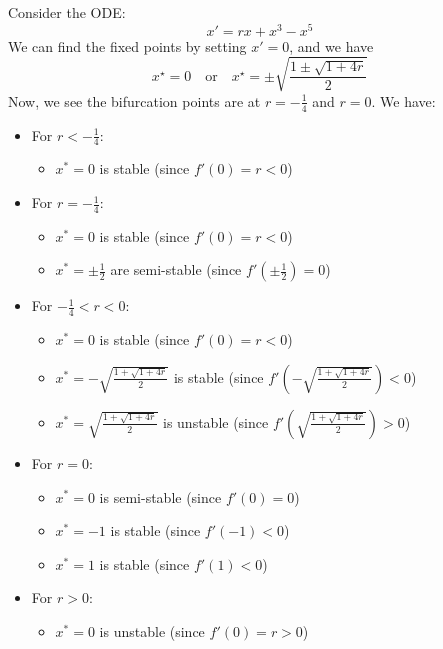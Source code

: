 \documentclass[11pt]{article}
\begin{document}
\begin{example}
    Consider the ODE:
    $$
    x' = rx + x^3 - x^5
    $$
    We can find the fixed points by setting \( x' = 0 \), and we have
    $$
    x^\star = 0 \quad \text{or} \quad x^\star = \pm\sqrt{\frac{1 \pm \sqrt{1 + 4r}}{2}}
    $$
    Now, we see the bifurcation points are at \( r = -\frac{1}{4} \) and \( r = 0 \). We have:
    \begin{itemize}
        \item For \( r < -\frac{1}{4} \):
        \begin{itemize}
            \item \( x^* = 0 \) is stable (since \( f'(0) = r < 0 \))
        \end{itemize}
        \item For \( r = -\frac{1}{4} \):
        \begin{itemize}
            \item \( x^* = 0 \) is stable (since \( f'(0) = r < 0 \))
            \item \( x^* = \pm\frac{1}{2} \) are semi-stable (since \( f'(\pm\frac{1}{2}) = 0 \))
        \end{itemize}
        \item For \( -\frac{1}{4} < r < 0 \):
        \begin{itemize}
            \item \( x^* = 0 \) is stable (since \( f'(0) = r < 0 \))
            \item \( x^* = -\sqrt{\frac{1 + \sqrt{1 + 4r}}{2}} \) is stable (since \( f'(-\sqrt{\frac{1 + \sqrt{1 + 4r}}{2}}) < 0 \))
            \item \( x^* = \sqrt{\frac{1 + \sqrt{1 + 4r}}{2}} \) is unstable (since \( f'(\sqrt{\frac{1 + \sqrt{1 + 4r}}{2}}) > 0 \))
        \end{itemize}
        \item For \( r = 0 \):
        \begin{itemize}
            \item \( x^* = 0 \) is semi-stable (since \( f'(0) = 0 \))
            \item \( x^* = -1 \) is stable (since \( f'(-1) < 0 \))
            \item \( x^* = 1 \) is stable (since \( f'(1) < 0 \))
        \end{itemize}
        \item For \( r > 0 \):
        \begin{itemize}
            \item \( x^* = 0 \) is unstable (since \( f'(0) = r > 0 \))

\end{itemize}
\end{itemize}
\end{example}
\end{document}
